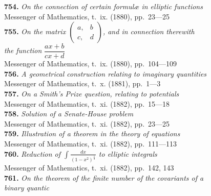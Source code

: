 \documentclass[12pt,a4paper,oneside]{book}
\begin{document}
\small
\noindent\textbf{754.} \textit{On the connection of certain formul\ae{} in elliptic functions} \\
\hspace*{2em}Messenger of Mathematics, t.~ix. (1880), pp.~23---25\\[0.4em]
\textbf{755.} \textit{On the matrix $\left(\begin{smallmatrix} a, & b \\ c, & d \end{smallmatrix}\right)$, and in connection therewith}\\
\hspace*{2em}\textit{the function} $\dfrac{ax+b}{cx+d}$ \\
\hspace*{2em}Messenger of Mathematics, t.~ix. (1880), pp.~104---109\\[0.4em]
\textbf{756.} \textit{A geometrical construction relating to imaginary quantities} \\
\hspace*{2em}Messenger of Mathematics, t.~x. (1881), pp.~1---3\\[0.4em]
\textbf{757.} \textit{On a Smith's Prize question, relating to potentials} \\
\hspace*{2em}Messenger of Mathematics, t.~xi. (1882), pp.~15---18\\[0.4em]
\textbf{758.} \textit{Solution of a Senate-House problem} \\
\hspace*{2em}Messenger of Mathematics, t.~xi. (1882), pp.~23---25\\[0.4em]
\textbf{759.} \textit{Illustration of a theorem in the theory of equations} \\
\hspace*{2em}Messenger of Mathematics, t.~xi. (1882), pp.~111---113\\[0.4em]
\textbf{760.} \textit{Reduction of $\displaystyle\int\!\frac{dx}{(1-x^2)^{\frac{1}{3}}}$ to elliptic integrals} \\
\hspace*{2em}Messenger of Mathematics, t.~xi. (1882), pp.~142, 143\\[0.4em]
\textbf{761.} \textit{On the theorem of the finite number of the covariants of a}\\
\hspace*{2em}\textit{binary quantic} \\
\end{document}
